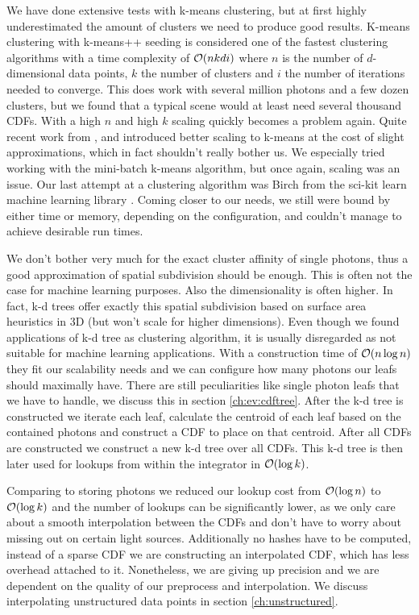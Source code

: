 We have done extensive tests with k-means clustering, but at first highly underestimated the amount of clusters we need to produce good results. K-means clustering with k-means++ seeding \cite{DBLP:conf/soda/ArthurV07} is considered one of the fastest clustering algorithms with a time complexity of $\mathcal{O}(nkdi)$ where $n$ is the number of $d$-dimensional data points, $k$ the number of clusters and $i$ the number of iterations needed to converge. This does work with several million photons and a few dozen clusters, but we found that a typical scene would at least need several thousand CDFs. With a high $n$ and high $k$ scaling quickly becomes a problem again. Quite recent work from \cite{DBLP:conf/kse/HieuM14}, \cite{DBLP:journals/tpds/XuQLMLL14} and \cite{DBLP:conf/www/Sculley10} introduced better scaling to k-means at the cost of slight approximations, which in fact shouldn't really bother us. We especially tried working with the mini-batch k-means algorithm, but once again, scaling was an issue. Our last attempt at a clustering algorithm was Birch \cite{DBLP:conf/sigmod/ZhangRL96} from the sci-kit learn machine learning library \cite{scikit-learn}. Coming closer to our needs, we still were bound by either time or memory, depending on the configuration, and couldn't manage to achieve desirable run times.

We don't bother very much for the exact cluster affinity of single photons, thus a good approximation of spatial subdivision should be enough. This is often not the case for machine learning purposes. Also the dimensionality is often higher. In fact, k-d trees offer exactly this spatial subdivision based on surface area heuristics in 3D (but won't scale for higher dimensions). Even though we found applications of k-d tree as clustering algorithm, it is usually disregarded as not suitable for machine learning applications. With a construction time of $\mathcal{O}(n \log n)$ they fit our scalability needs and we can configure how many photons our leafs should maximally have. There are still peculiarities like single photon leafs that we have to handle, we discuss this in section \ref{ch:ev:cdftree}. After the k-d tree is constructed we iterate each leaf, calculate the centroid of each leaf based on the contained photons and construct a CDF to place on that centroid. After all CDFs are constructed we construct a new k-d tree over all CDFs. This k-d tree is then later used for lookups from within the integrator in $\mathcal{O}(\log k)$.

Comparing to storing photons we reduced our lookup cost from $\mathcal{O}(\log n)$ to $\mathcal{O}(\log k)$ and the number of lookups can be significantly lower, as we only care about a smooth interpolation between the CDFs and don't have to worry about missing out on certain light sources. Additionally no hashes have to be computed, instead of a sparse CDF we are constructing an interpolated CDF, which has less overhead attached to it. Nonetheless, we are giving up precision and we are dependent on the quality of our preprocess and interpolation. We discuss interpolating unstructured data points in section \ref{ch:unstructured}.

